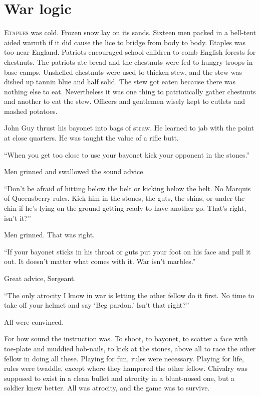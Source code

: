 \chapter*{\textsf{War logic}}

E\textsc{taples} was cold. Frozen snow lay on its sands. Sixteen men 
packed in a bell-tent aided warmth if it did cause the lice to bridge 
from body to body. Etaples was too near England. Patriots encouraged 
school children to comb English forests for chestnuts. The patriots ate 
bread and the chestnuts were fed to hungry troops in base camps. Unshelled 
chestnuts were used to thicken stew, and the stew was dished up tannin 
blue and half solid. The stew got eaten because there was nothing else 
to eat. Nevertheless it was one thing to patriotically gather chestnuts 
and another to eat the stew. Officers and gentlemen wisely kept to cutlets 
and mashed potatoes.

John Guy thrust his bayonet into bags of straw. He learned to jab with the 
point at close quarters. He was taught the value of a rifle butt.

``When you get too close to use your bayonet kick your opponent in the 
stones.''

Men grinned and swallowed the sound advice.

``Don't be afraid of hitting below the belt or kicking below the belt. No 
Marquis of Queensberry rules. Kick him in the stones, the guts, the shins, 
or under the chin if he's lying on the ground getting ready to have another 
go. That's right, isn't it?''

Men grinned. That was right.

``If your bayonet sticks in his throat or guts put your foot on his face 
and pull it out. It doesn't matter what comes with it. War isn't marbles.''

Great advice, Sergeant.

``The only atrocity I know in war is letting the other fellow do it first. 
No time to take off your helmet and say `Beg pardon.' Isn't that right?''

All were convinced.

For how sound the instruction was. To shoot, to bayonet, to scatter a face 
with toe-plate and muddied hob-nails, to kick at the stones, above all to 
race the other fellow in doing all these. Playing for fun, rules were 
necessary. Playing for life, rules were twaddle, except where they hampered 
the other fellow. Chivalry was supposed to exist in a clean bullet and 
atrocity in a blunt-nosed one, but a soldier knew better. All was atrocity, 
and the game was to survive.

